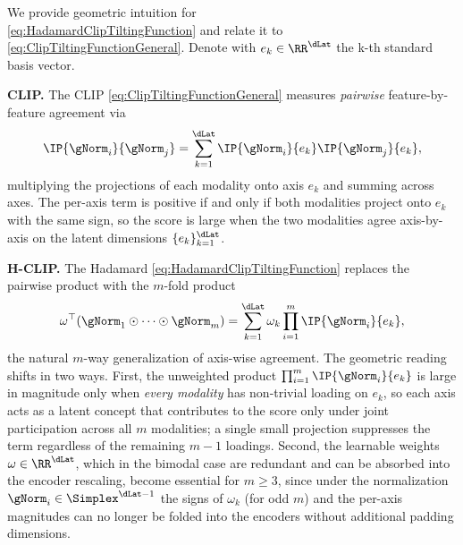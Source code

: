 \documentclass{article}
\begin{document}
\begin{remark}
 We provide geometric intuition for\\ \eqref{eq:HadamardClipTiltingFunction}
 and relate it to \eqref{eq:ClipTiltingFunctionGeneral}. Denote with
 $e_k \in \RR^{\dLat}$
 the k-th standard basis vector.

 \textbf{CLIP.} The CLIP \eqref{eq:ClipTiltingFunctionGeneral}
 measures \emph{pairwise} feature-by-feature agreement via
 \begin{align*}
  \IP{\gNorm_i}{\gNorm_j} = \sum_{k=1}^{\dLat}
  \IP{\gNorm_i}{e_k} \IP{\gNorm_j}{e_k},
 \end{align*}
 multiplying the projections of each modality onto axis $e_k$
 and summing across axes. The per-axis term is positive if and only if both modalities
 project onto $e_k$ with the same sign, so the score is large when the two
 modalities agree axis-by-axis on the latent dimensions
 $\{e_k\}_{k=1}^{\dLat}$.

 \textbf{H-CLIP.} The Hadamard
 \eqref{eq:HadamardClipTiltingFunction} replaces the pairwise product with
 the $m$-fold product
 \begin{align*}
  \omega^\top (\gNorm_1 \odot \cdots \odot \gNorm_m)
  = \sum_{k=1}^{\dLat} \omega_k \prod_{i=1}^m \IP{\gNorm_i}{e_k},
 \end{align*}
 the natural $m$-way generalization of axis-wise agreement. The geometric
 reading shifts in two ways. First, the unweighted product
 $\prod_{i=1}^{m}\IP{\gNorm_i}{e_k}$
 is large in magnitude only when
 \emph{every modality} has non-trivial loading on $e_k$, so each axis acts
 as a latent concept that contributes to the score only under joint
 participation across all $m$ modalities; a single small projection
 suppresses the term regardless of the remaining $m-1$ loadings. Second,
 the learnable weights $\omega\in \RR^{\dLat}$, which in the bimodal
 case are redundant and can be absorbed into the encoder rescaling, become
 essential for $m\geq 3$, since under the normalization
 $\gNorm_i \in \Simplex^{\dLat -1}$ the signs of $\omega_k$ (for odd $m$)
 and the  per-axis magnitudes can no longer be folded into the encoders without
 additional padding dimensions.
\end{remark}
\end{document}
